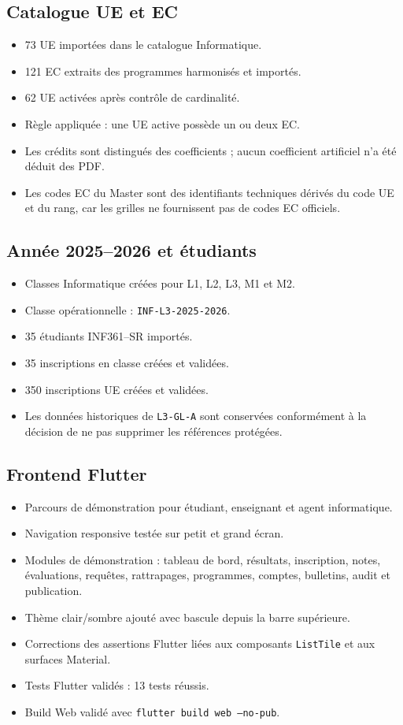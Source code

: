 \documentclass[11pt,a4paper]{article}
\begin{document}
\subsection{Catalogue UE et EC}
\begin{itemize}
  \item 73 UE importées dans le catalogue Informatique.
  \item 121 EC extraits des programmes harmonisés et importés.
  \item 62 UE activées après contrôle de cardinalité.
  \item Règle appliquée : une UE active possède un ou deux EC.
  \item Les crédits sont distingués des coefficients ; aucun coefficient artificiel n'a été déduit des PDF.
  \item Les codes EC du Master sont des identifiants techniques dérivés du code UE et du rang, car les grilles ne fournissent pas de codes EC officiels.
\end{itemize}

\subsection{Année 2025--2026 et étudiants}
\begin{itemize}
  \item Classes Informatique créées pour L1, L2, L3, M1 et M2.
  \item Classe opérationnelle : \texttt{INF-L3-2025-2026}.
  \item 35 étudiants INF361--SR importés.
  \item 35 inscriptions en classe créées et validées.
  \item 350 inscriptions UE créées et validées.
  \item Les données historiques de \texttt{L3-GL-A} sont conservées conformément à la décision de ne pas supprimer les références protégées.
\end{itemize}

\subsection{Frontend Flutter}
\begin{itemize}
  \item Parcours de démonstration pour étudiant, enseignant et agent informatique.
  \item Navigation responsive testée sur petit et grand écran.
  \item Modules de démonstration : tableau de bord, résultats, inscription, notes, évaluations, requêtes, rattrapages, programmes, comptes, bulletins, audit et publication.
  \item Thème clair/sombre ajouté avec bascule depuis la barre supérieure.
  \item Corrections des assertions Flutter liées aux composants \texttt{ListTile} et aux surfaces Material.
  \item Tests Flutter validés : 13 tests réussis.
  \item Build Web validé avec \texttt{flutter build web --no-pub}.
\end{itemize}
\end{document}
